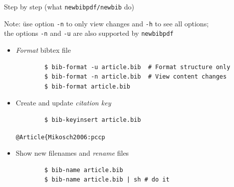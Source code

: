 \documentclass[xcolor={table,dvipsnames}]{beamer}
\renewcommand{\emph}[1]{\textit{\color{orange!90!brown}#1}}
\newcommand{\faint}{\color{black!10!gray}}
\begin{document}
\begin{frame}[fragile]{Step by step (what \texttt{newbibpdf/newbib} do)}
  \begin{tabbing}
    Note: \=use option {\faint\verb!-n!} to only view changes
                   and {\faint\verb!-h!} to see all options; \\
	  \>the options {\faint\verb!-n!} and {\faint\verb!-u!}
	  are also supported by \texttt{newbibpdf}
  \end{tabbing}

  \begin{itemize}

    \item \emph{Format} bibtex file
      \begin{lstlisting}
        $ bib-format -u article.bib  # Format structure only
        $ bib-format -n article.bib  # View content changes
        $ bib-format article.bib
      \end{lstlisting}

    \item Create and update \emph{citation key}
      \begin{lstlisting}
        $ bib-keyinsert article.bib
      \end{lstlisting}
      \vspace{-0.5\baselineskip}
      \hfill{\faint\verb!@Article{Mikosch2006:pccp!}

    \item Show new filenames and \emph{rename} files
      \begin{lstlisting}
        $ bib-name article.bib
        $ bib-name article.bib | sh # do it
      \end{lstlisting}

  \end{itemize}
\end{frame}
\end{document}
